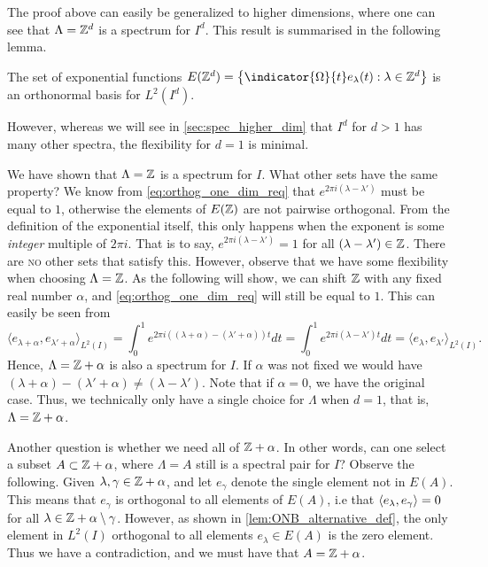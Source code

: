 \documentclass[../thesis.tex]{subfiles}
\begin{document}
The proof above can easily be generalized to higher dimensions, where one can see that $\Lambda = \mathbb{Z}^d$ is a spectrum for $I^d$. This result is summarised in the following lemma.
\begin{lemma}
    The set of exponential functions $E(\Z^d) = \braqMed{\indicator{\Omega}{t} e_\lambda(t) : \lambda \in \Z^d}$ is an orthonormal basis for $L^2(I^d)$.
\end{lemma}

However, whereas we will see in \cref{sec:spec_higher_dim} that $I^d$ for $d>1$ has many other spectra, the flexibility for $d=1$ is minimal. 

We have shown that $\Lambda = \mathbb{Z}$ is a spectrum for $I$. What other sets have the same property? We know from \cref{eq:orthog_one_dim_req} that $e^{2\pi i(\lambda-\lambda')}$ must be equal to $1$, otherwise the elements of $E(\mathbb{Z})$ are not pairwise orthogonal. From the definition of the exponential itself, this only happens when the exponent is some \emph{integer} multiple of $2 \pi i$. That is to say, $e^{2\pi i(\lambda-\lambda')} = 1$ for all $(\lambda-\lambda') \in \mathbb{Z}$. There are \textsc{no} other sets that satisfy this. However, observe that we have some flexibility when choosing $\Lambda = \mathbb{Z}$. As the following will show, we can shift $\mathbb{Z}$ with any fixed real number $\alpha$, and \cref{eq:orthog_one_dim_req} will still be equal to $1$. This can easily be seen from 
\begin{equation}
    \langle e_{\lambda+\alpha},e_{\lambda'+\alpha} \rangle_{L^2(I)} = \int_0^1 e^{2 \pi i ((\lambda+\alpha) - (\lambda'+\alpha))t} dt = \int_0^1 e^{2 \pi i (\lambda-\lambda')t} dt = \langle e_{\lambda},e_{\lambda'} \rangle_{L^2(I)}.
\end{equation}
Hence, $\Lambda = \mathbb{Z} + \alpha$ is also a spectrum for $I$. If $\alpha$ was not fixed we would have $(\lambda+\alpha) - (\lambda'+\alpha) \neq (\lambda - \lambda')$. Note that if $\alpha=0$, we have the original case. Thus, we technically only have a single choice for $\Lambda$ when $d=1$, that is, $\Lambda = \mathbb{Z}+ \alpha$. 

Another question is whether we need all of $\mathbb{Z} +\alpha$. In other words, can one select a subset $A\subset \mathbb{Z} + \alpha$, where $\Lambda = A$ still is a spectral pair for $I$? Observe the following. Given $\lambda, \gamma \in \mathbb{Z}+\alpha$, and let $e_{\gamma}$ denote the single element not in $E(A)$. This means that $e_\gamma$ is orthogonal to all elements of $E(A)$, i.e that $\langle e_{\lambda}, e_{\gamma}\rangle = 0$ for all $\lambda \in \mathbb{Z} +\alpha\setminus \gamma$. However, as shown in \cref{lem:ONB_alternative_def}, the only element in $L^2(I)$ orthogonal to all elements $e_{\lambda} \in E(A)$ is the zero element. Thus we have a contradiction, and we must have that $A = \mathbb{Z}+\alpha$.
\end{document}
